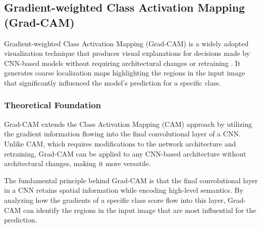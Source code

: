 \documentclass[a4paper,12pt]{report}
\begin{document}
\subsection{Gradient-weighted Class Activation Mapping (Grad-CAM)}

Gradient-weighted Class Activation Mapping (Grad-CAM) is a widely adopted visualization technique that produces visual explanations for decisions made by CNN-based models without requiring architectural changes or retraining \citep{Selvaraju_2019}. It generates coarse localization maps highlighting the regions in the input image that significantly influenced the model's prediction for a specific class.

\subsubsection{Theoretical Foundation}

Grad-CAM extends the Class Activation Mapping (CAM) approach \citep{zhou2015learningdeepfeaturesdiscriminative} by utilizing the gradient information flowing into the final convolutional layer of a CNN. Unlike CAM, which requires modifications to the network architecture and retraining, Grad-CAM can be applied to any CNN-based architecture without architectural changes, making it more versatile.

The fundamental principle behind Grad-CAM is that the final convolutional layer in a CNN retains spatial information while encoding high-level semantics. By analyzing how the gradients of a specific class score flow into this layer, Grad-CAM can identify the regions in the input image that are most influential for the prediction.

\end{document}
